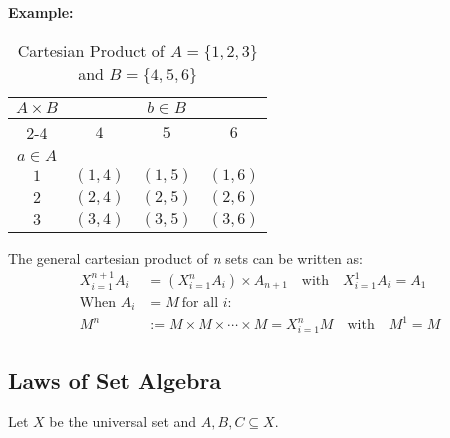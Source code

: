 \textbf{Example:}
\begin{table}[H]
	\centering
	\caption{Cartesian Product of \(A = \{1, 2, 3\}\) and \(B = \{4, 5, 6\}\)}
	\begin{tabular}{|c|c|c|c|}
		\hline
		\multirow{3}{*}{\(A \times B\)} & \multicolumn{3}{c|}{\(b \in B\)}                       \\
		\cline{2-4}
		                              & \(4\)                            & \(5\)      & \(6\)      \\
		\hline
		\(a \in A\)                     &                                &          &          \\
		\hline
		\(1\)                           & \((1, 4)\)                       & \((1, 5)\) & \((1, 6)\) \\
		\hline
		\(2\)                           & \((2, 4)\)                       & \((2, 5)\) & \((2, 6)\) \\
		\hline
		\(3\)                           & \((3, 4)\)                       & \((3, 5)\) & \((3, 6)\) \\
		\hline
	\end{tabular}
	\label{tab:cartesian_product}
\end{table}

The general cartesian product of \textit{n} sets can be written as:
\begin{align*}
	X_{i = 1}^{n + 1} A_i & = \left( X_{i = 1}^{n} A_i \right) \times A_{n + 1} \quad \text{with} \quad X_{i = 1}^{1} A_i = A_1 \\
	\text{When } A_i      & = M \ \text{for all } i:                                                                            \\
	M^n                   & := M \times M \times \cdots \times M = X_{i = 1}^{n} M \quad \text{with} \quad M^1 = M
\end{align*}

\subsection{Laws of Set Algebra}
Let \(X\) be the universal set and \(A, B, C \subseteq X\).

